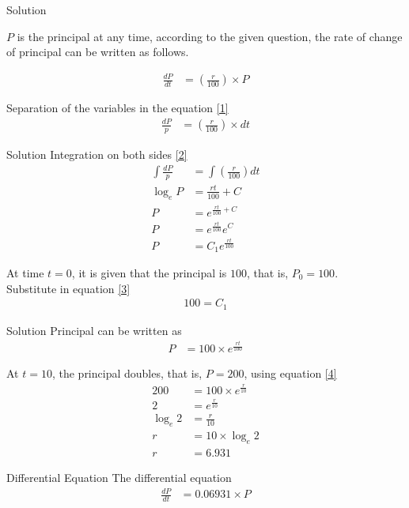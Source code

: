 \documentclass{beamer}
\providecommand{\brak}[1]{\ensuremath{\left(#1\right)}}
\theoremstyle{remark}
\numberwithin{equation}{section}
\begin{document}
\begin{frame}{Solution}

    $P$ is the principal at any time, according to the given question, the rate of change of principal can be written as follows.

    \begin{align}
        \frac{dP}{dt} &= \brak{\frac{r}{100}} \times P \label{1}
    \end{align}

    Separation of the variables in the equation \eqref{1}
    \begin{align}
         \frac{dP}{p} &= \brak{\frac{r}{100}} \times dt \label{2}
    \end{align}
\end{frame}
\begin{frame}{Solution}
    Integration on both sides \eqref{2}
    \begin{align}
        \int{\frac{dP}{p}} &= \int{\brak{\frac{r}{100}} dt}\\
        \log_e{P} &= \frac{rt}{100} + C\\
        P &= e^{\frac{rt}{100} + C}\\
        P &= e^{\frac{rt}{100}}e^C\\
        P &= C_1e^{\frac{rt}{100}} \label{3}
    \end{align}

    At time $t = 0$, it is given that the principal is $100$, that is, $P_0 = 100$. \\ 
    Substitute in equation \eqref{3}
    \begin{align}
        100 = C_1
    \end{align}
\end{frame}
\begin{frame}{Solution}
    Principal can be written as
    \begin{align}
        P &= 100 \times e^{\frac{rt}{100}} \label{4}
    \end{align}

    At $t = 10$, the principal doubles, that is, $P = 200$, using equation \eqref{4}
    \begin{align}
        200 &= 100 \times e^{\frac{r}{10}}\\
        2 &= e^{\frac{r}{10}}\\
        \log_e{2} &= \frac{r}{10}\\
        r &= 10 \times \log_e{2}\\
        r &= 6.931
    \end{align}
\end{frame}
\begin{frame}{Differential Equation}
    The differential equation 
    \begin{align}
        \frac{dP}{dt} &= 0.06931 \times P \label{diffeq}
    \end{align}
\end{frame}
\end{document}
